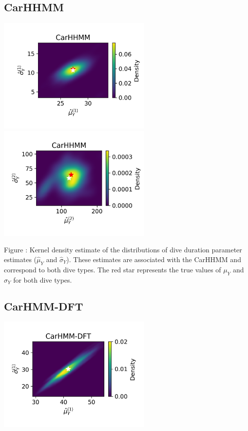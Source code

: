 \documentclass{article}
\begin{document}
        \subsection{CarHHMM}
        \begin{center}
        \includegraphics[width=3in]{../Plots/hhmm_V_MLE_density_dive_duration_-1_0.png}
        \includegraphics[width=3in]{../Plots/hhmm_V_MLE_density_dive_duration_-1_1.png}
        \end{center}
        
        \noindent Figure : Kernel density estimate of the distributions of dive duration parameter estimates ($\hat \mu_Y$ and $\hat \sigma_Y$). These estimates are associated with the CarHHMM and correspond to both dive types. The red star represents the true values of $\mu_Y$ and $\sigma_Y$ for both dive types.
        \addtocounter{fignum}{1}
        
        \subsection{CarHMM-DFT}
        \begin{center}
        \includegraphics[width=3in]{../Plots/hmm_FV_MLE_density_dive_duration_-1_0.png}
        \end{center}
        
\end{document}
